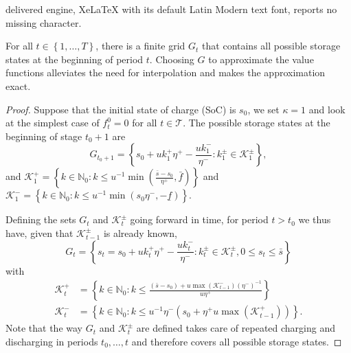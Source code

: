 \documentclass[10pt,a4paper]{amsart}
\newcommand{\Kc}{\ensuremath{\mathcal{K}}}
\newcommand{\Nd}{\ensuremath{\mathds{N}}}
\newcommand{\Tc}{\ensuremath{\mathcal{T}}}
\newcommand{\set}[1]{ \ensuremath{\left\{ #1 \right\}} }
\begin{document}
delivered engine, XeLaTeX with its default Latin Modern text font, reports no missing character.
\begin{prop}
    For all $t \in \set{1, \dots, T}$, there is a finite grid $G_t$ that contains all possible storage states at the beginning of period $t$. Choosing $G$ to approximate the value functions alleviates the need for interpolation and makes the approximation exact.
\end{prop}

\begin{proof}
    Suppose that the initial state of charge (SoC) is $s_0$, we set $\kappa=1$ and look at the simplest case of $f_t^0 = 0$ for all $t \in \Tc$. The possible storage states at the beginning of stage $t_0+1$ are
    \begin{equation}
        G_{t_0+1} = \set{s_0 + uk_1^+\eta^+ - \frac{uk_1^-}{\eta^-}: k_1^\pm\in \Kc_1^\pm},
    \end{equation}
    and $\Kc_1^+=\set{ k\in \Nd_0: k\leq u^{-1} \min \left(\frac{\bar s-s_0}{\eta^+}, \bar f \right)}$ and $\Kc_1^-=\set{ k\in \Nd_0: k\leq u^{-1}\min \left( s_0\eta^-, -\underline f \right)}$.

    Defining the sets $G_t$ and $\Kc_t^\pm$ going forward in time, for period $t > t_0$ we thus have, given that $\Kc_{t-1}^{\pm}$ is already known, 
    \begin{equation}
        G_t = \set{s_t=s_0 + uk_t^+\eta^+ - \frac{uk_t^-}{\eta^-}: k_t^\pm\in \Kc_t^\pm, 0\leq s_t \leq \bar s}
    \end{equation}
    with 
    \begin{align}
        \Kc_t^+&=\set{k \in \Nd_0: k \leq \frac{(\bar s - s_0) + u\max (\Kc_{t-1}^-)(\eta^-)^{-1}}{u \eta^+}} \\
        \Kc_t^-&=\set{k \in \Nd_0: k \leq u^{-1} \eta^-\left( s_0+\eta^+u\max (\Kc_{t-1}^+)\right)}.
    \end{align}
    Note that the way $G_t$ and $\Kc_t^\pm$ are defined takes care of repeated charging and discharging in periods $t_0, \dots, t$ and therefore covers all possible storage states.
\end{proof}
\end{document}
